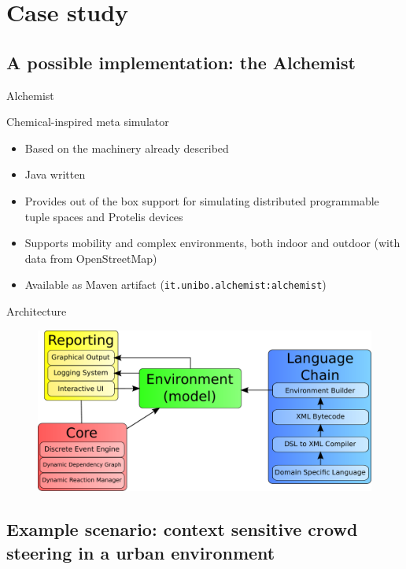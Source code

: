 \documentclass[presentation]{beamer} %
\begin{document}
\section{Case study}
\subsection{A possible implementation: the Alchemist}

\begin{frame}{Alchemist}
  \begin{block}{Chemical-inspired meta simulator}
    \begin{itemize}
      \item Based on the machinery already described
      \item Java written
      \item Provides out of the box support for simulating distributed programmable tuple spaces and Protelis \cite{protelis} devices
      \item Supports mobility and complex environments, both indoor and outdoor (with data from OpenStreetMap)
      \item Available as Maven artifact (\texttt{it.unibo.alchemist:alchemist})
    \end{itemize}
  \end{block}
\end{frame}

\begin{frame}{Architecture}
  \begin{figure}
    \includegraphics[width=\textwidth]{imgs/architecture} 
  \end{figure}
\end{frame}

\subsection{Example scenario: context sensitive crowd steering in a urban environment}
\end{document}
